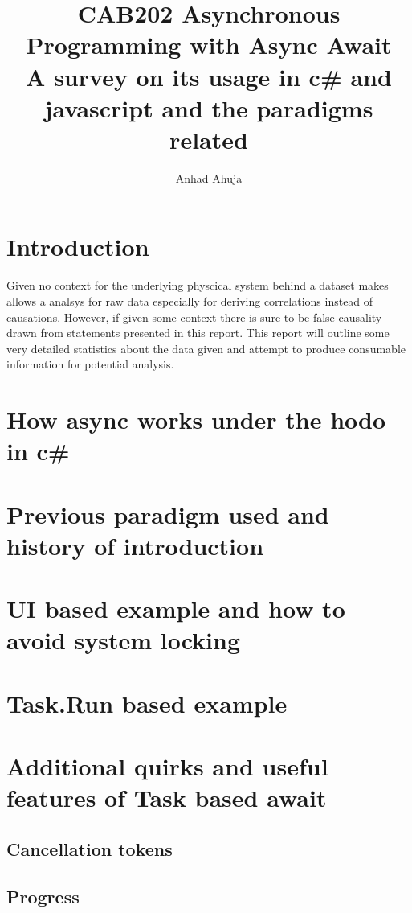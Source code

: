 \documentclass{article}
\title{CAB202 Asynchronous Programming with Async Await
\\\large A survey on its usage in c\# and javascript and the paradigms related}
\author{Anhad Ahuja}
\begin{document}
\maketitle



\section{Introduction}


Given no context for the underlying physcical system behind a dataset makes allows a analsys for raw data especially for deriving correlations instead of causations. However, if given some context there is sure to be false causality drawn from statements presented in this report. This report will outline some very detailed statistics about the data given and attempt to produce consumable information for potential analysis. 

\newpage

\section{How async works under the hodo in c\#}

\section{Previous paradigm used and history of introduction}

\section{UI based example and how to avoid system locking}

\section{Task.Run based example}

\section{Additional quirks and useful features of Task based await}
\subsection{Cancellation tokens}
\subsection{Progress}






\end{document}
